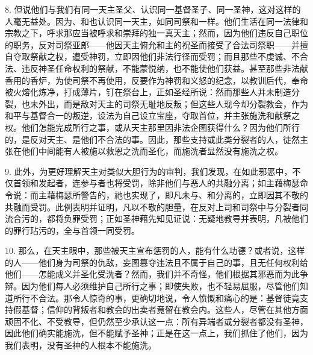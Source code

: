 8. 但说他们与我们有同一天主圣父、认识同一基督圣子、同一圣神，这对这样的人毫无益处。因为、和也认识同一天主，如同司祭和一样。他们生活在同一法律和宗教之下，呼求那应当被呼求和崇拜的独一真天主；然而，因为他们违反自己职位的职务，反对司祭亚郎——他因天主俯允和主的祝圣而接受了合法司祭职——并擅自夺取祭献之权，遭受神罚，立即因他们非法行径而受罚；而且那些不虔诚、不合法、违反神圣任命权利的祭献，不能蒙悦纳，也不能使他们获益。甚至那些非法献香用的香炉，为使司祭不再使用，反要作为神罚和义怒的纪念，以教训后代，奉命被火熔化炼净，打成薄片，钉在祭台上，正如圣经所说：然而那些人并未制造分裂，也未外出，而是敌对天主的司祭无耻地反叛；但这些人现今却分裂教会，作为和平与基督合一的叛逆，设法为自己设立宝座，夺取首位，并主张施洗和献祭之权。他们怎能完成所行之事，或从天主那里因非法企图获得什么？因为他们所行的，是反对天主、是他们不合法的事。因此，那些支持或此类分裂者的人，徒然主张在他们中间能有人被施以救恩之洗而圣化，而施洗者显然没有施洗之权。\par

9. 此外，为更好理解天主对类似大胆行为的审判，我们发现，在如此邪恶中，不仅首领和发起者，连参与者也将受罚，除非他们与恶人的共融分离；如主藉梅瑟命令说：而主藉梅瑟所警告的，祂也实现了，即凡未与、和分离的，立即因其不敬的共融而受罚。此例表明并证明，凡以不敬的胆量，在反对上司和司祭中与分裂者同流合污的，都将负罪受罚；正如圣神藉先知见证说：无疑地教导并表明，凡被他们的罪行玷污的，全与首领一同受罚。\par

10. 那么，在天主眼中，那些被天主宣布惩罚的人，能有什么功德？或者说，这样的人——他们身为司祭的仇敌，妄图篡夺违法且不属于自己的事，且无任何权利给他们——怎能成义并圣化受洗者？然而，我们并不奇怪，他们根据其邪恶而为此争辩。因为他们每人必须维护自己所行之事；即使失败，也不轻易屈服，尽管他们知道所行不合法。那令人惊奇的事，更确切地说，令人愤慨和痛心的是：基督徒竟支持假基督；信仰的背叛者和教会的出卖者竟留在教会内。这些人，尽管在其他方面顽固不化、不受教导，但仍然至少承认这一点：所有异端者或分裂者都没有圣神，因此他们确实能施洗，但不能赋予圣神；正是在这一点上，我们抓住了他们，因为我们表明，没有圣神的人根本不能施洗。\par

